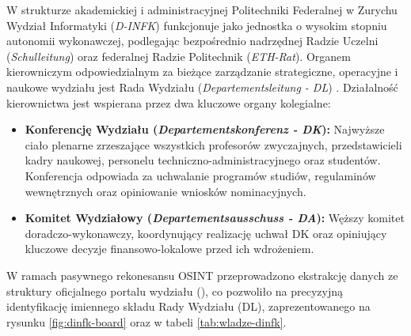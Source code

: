 W strukturze akademickiej i administracyjnej Politechniki Federalnej w Zurychu Wydział Informatyki (\textit{D-INFK}) funkcjonuje jako jednostka o wysokim stopniu autonomii wykonawczej, podlegając bezpośrednio nadrzędnej Radzie Uczelni (\textit{Schulleitung}) oraz federalnej Radzie Politechnik (\textit{ETH-Rat}). Organem kierowniczym odpowiedzialnym za bieżące zarządzanie strategiczne, operacyjne i naukowe wydziału jest Rada Wydziału (\textit{Departementsleitung - DL}) \cite{eth_dinfk_org}. Działalność kierownictwa jest wspierana przez dwa kluczowe organy kolegialne:
\begin{itemize}
    \item \textbf{Konferencję Wydziału (\textit{Departementskonferenz - DK}):} Najwyższe ciało plenarne zrzeszające wszystkich profesorów zwyczajnych, przedstawicieli kadry naukowej, personelu techniczno-administracyjnego oraz studentów. Konferencja odpowiada za uchwalanie programów studiów, regulaminów wewnętrznych oraz opiniowanie wniosków nominacyjnych.
    \item \textbf{Komitet Wydziałowy (\textit{Departementsausschuss - DA}):} Węższy komitet doradczo-wykonawczy, koordynujący realizację uchwał DK oraz opiniujący kluczowe decyzje finansowo-lokalowe przed ich wdrożeniem.
\end{itemize}

W ramach pasywnego rekonesansu OSINT przeprowadzono ekstrakcję danych ze struktury oficjalnego portalu wydziału (), co pozwoliło na precyzyjną identyfikację imiennego składu Rady Wydziału (DL), zaprezentowanego na rysunku \ref{fig:dinfk-board} oraz w tabeli \ref{tab:wladze-dinfk}.


